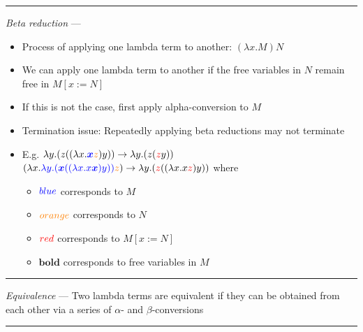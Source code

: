 {\color{lightgray}\hrule height 0.001mm}

\emph{Beta reduction} ---
\begin{itemize}
    \item Process of applying one lambda term to another: $(\lambda x.M)N$
    \item We can apply one lambda term to another if the free variables in $N$ remain free in $M[x := N]$
    \item If this is not the case, first apply alpha-conversion to $M$
    \item Termination issue: Repeatedly applying beta reductions may not terminate
    \item E.g. $\lambda y.(z((\lambda x.\textcolor{blue}{\boldsymbol{x}}\textcolor{orange}{z})y)) \to \lambda y.(z(\textcolor{red}{z}y))$\\
    $(\lambda x.\textcolor{blue}{\lambda y.(\boldsymbol{x}((\lambda x.x\boldsymbol{x})y))}\textcolor{orange}{z}) \to \lambda y.(\textcolor{red}{z}((\lambda x.x\textcolor{red}{z})y))$
    where
    \begin{itemize}
        \item $\textcolor{blue}{blue}$ corresponds to $M$
        \item $\textcolor{orange}{orange}$ corresponds to $N$
        \item $\textcolor{red}{red}$ corresponds to $M[x := N]$
        \item $\boldsymbol{bold}$ corresponds to free variables in $M$
    \end{itemize}
\end{itemize}

{\color{lightgray}\hrule height 0.001mm}

\emph{Equivalence} --- Two lambda terms are equivalent if they can be obtained from each other via a series of $\alpha$- and $\beta$-conversions

{\color{black}\hrule height 0.001mm}

